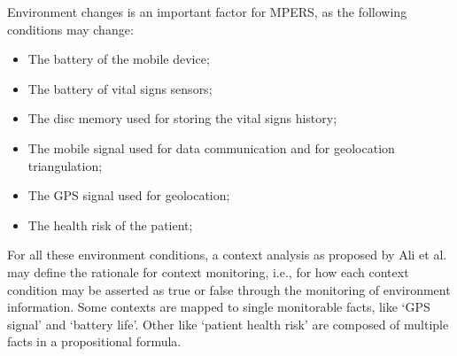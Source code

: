 Environment changes is an important factor for MPERS, as the following conditions may change:

\begin{itemize}

\item The battery of the mobile device;
\medskip

\item The battery of vital signs sensors;
\medskip

\item The disc memory used for storing the vital signs history;

\item The mobile signal used for data communication and for geolocation triangulation;
\medskip

\item The GPS signal used for geolocation;
\medskip

\item The health risk of the patient;
\medskip

\end{itemize}

For all these environment conditions, a context analysis as proposed by Ali et al. may define the rationale for context monitoring, i.e., for how each context condition may be asserted as true or false through the monitoring of environment information. Some contexts are mapped to single monitorable facts, like `GPS signal' and `battery life'. Other like `patient health risk' are composed of multiple facts in a propositional formula.




